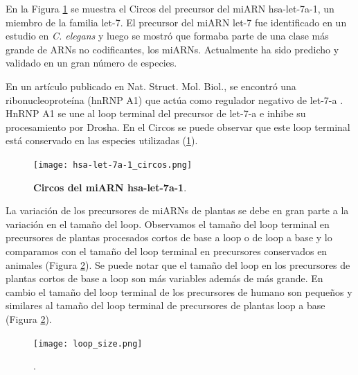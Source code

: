 En la Figura \ref{fig:hsa-let-7a-1_circos} se muestra el Circos del precursor del miARN hsa-let-7a-1, un miembro de la familia let-7.
El precursor del miARN let-7 fue identificado en un estudio en \textit{C. elegans} y luego se mostró que formaba parte de una clase más grande de ARNs no codificantes, los miARNs.
Actualmente ha sido predicho y validado en un gran número de especies.

En un artículo publicado en Nat. Struct. Mol. Biol., se encontró una ribonucleoproteína (hnRNP A1) que actúa como regulador negativo de let-7-a \citep{pmid20639884}.
HnRNP A1 se une al loop terminal del precursor de let-7-a e inhibe su procesamiento por Drosha.
En el Circos se puede observar que este loop terminal está conservado en las especies utilizadas (\ref{fig:hsa-let-7a-1_circos}).

\begin{figure}[htbp!] 
	\centering    
	\texttt{[image: hsa-let-7a-1\_circos.png]}
	\caption[Circos del miARN hsa-let-7a-1]{
		\textbf{Circos del miARN hsa-let-7a-1}.
	}
	\label{fig:hsa-let-7a-1_circos}
\end{figure}


La variación de los precursores de miARNs de plantas se debe en gran parte a la variación en el tamaño del loop.
Observamos el tamaño del loop terminal en precursores de plantas procesados cortos de base a loop o de loop a base y lo comparamos con el tamaño del loop terminal en precursores conservados en animales (Figura \ref{fig:loop_size}).
Se puede notar que el tamaño del loop en los precursores de plantas cortos de base a loop son más variables además de más grande.
En cambio el tamaño del loop terminal de los precursores de humano son pequeños y similares al tamaño del loop terminal de precursores de plantas loop a base (Figura \ref{fig:loop_size}).


\begin{figure}[htbp!] 
	\centering    
	\texttt{[image: loop\_size.png]}
	\caption[]{
		\textbf{}.
	}
	\label{fig:loop_size}
\end{figure}

